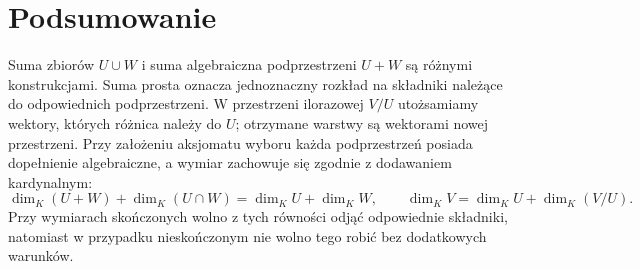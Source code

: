 \section{Podsumowanie}
\label{sec:lin2-podsumowanie}

Suma zbiorów \(U\cup W\) i suma algebraiczna
podprzestrzeni \(U+W\) są różnymi konstrukcjami.
Suma prosta oznacza jednoznaczny rozkład na składniki
należące do odpowiednich podprzestrzeni.
W przestrzeni ilorazowej \(V/U\) utożsamiamy wektory,
których różnica należy do \(U\); otrzymane warstwy
są wektorami nowej przestrzeni.
Przy założeniu aksjomatu wyboru każda podprzestrzeń
posiada dopełnienie algebraiczne, a wymiar
zachowuje się zgodnie z dodawaniem kardynalnym:
\[
 \dim_K(U+W)+\dim_K(U\cap W)=\dim_KU+\dim_KW,
 \qquad
 \dim_KV=\dim_KU+\dim_K(V/U).
\]
Przy wymiarach skończonych wolno z tych równości
odjąć odpowiednie składniki, natomiast
w przypadku nieskończonym nie wolno tego robić
bez dodatkowych warunków.
